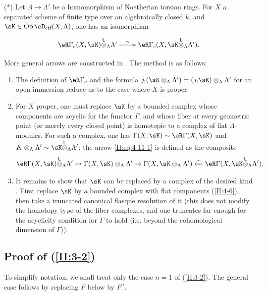 (*) Let $\Lambda\to\Lambda'$ be a homomorphism of Noetherian torsion rings.
For $X$ a separated scheme of finite type over an algebraically closed $k$,
and $\sK\in\ob\eD_\text{ctf}(X,\Lambda)$, one has an isomorphism
\[\xymatrix{
  \eR\Gamma_c(X,\sK)\lotimes_\Lambda \Lambda' \ar[r]^-\sim & \eR \Gamma_c(X,\sK\lotimes_\Lambda \Lambda') \text{.}
}\]

More general arrows are constructed in \cite[XVII 4.2.12]{sga4}. The method
is as follows:
\begin{enumerate}[\indent a)]
  \item The definition of $\eR\Gamma_c$ and the formula
    $j_!(\sK\otimes_\Lambda\Lambda') = (j_! \sK)\otimes_\Lambda\Lambda'$ for
    an open immersion reduce us to the case where $X$ is proper.
  \item For $X$ proper, one must replace $\sK$ by a bounded complex whose
    components are acyclic for the functor $\Gamma$, and whose fiber at every
    geometric point (or merely every closed point) is homotopic to a complex
    of flat $\Lambda$-modules. For such a complex, one has
    $\Gamma(X,\sK)\sim \eR\Gamma(X,\sK)$ and
    $K\otimes_\Lambda\Lambda'\sim \sK\lotimes_\Lambda\Lambda'$; the arrow
    \eqref{II:eq:4-11-1} is defined as the composite
    \[
      \eR\Gamma(X,\sK)\lotimes_\Lambda \Lambda' \to \Gamma(X,\sK)\otimes_\Lambda\Lambda' \to \Gamma(X,\sK\otimes_\Lambda\Lambda') \xleftarrow\sim \eR\Gamma(X,\sK\lotimes_\Lambda\Lambda') \text{.}
    \]
  \item It remains to show that $\sK$ can be replaced by a complex of the
    desired kind \cite[XVII.4.2.10]{sga4}. First replace $\sK$ by a bounded
    complex with flat components (\ref{II:4-6}), then take a truncated
    canonical flasque resolution of it (this does not modify the homotopy
    type of the fiber complexes, and one truncates far enough for the
    acyclicity condition for $\Gamma$ to hold (i.e. beyond the cohomological
    dimension of $\Gamma$)).
\end{enumerate}






\subsection{Proof of \texorpdfstring{(\ref{II:3-2})}{(3.2)}}\label{II:4-13}

To simplify notation, we shall treat only the case $n=1$ of
(\ref{II:3-2}). The general case follows by replacing $F$ below by $F^n$.

